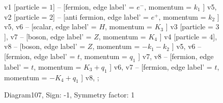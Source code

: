 \documentclass{revtex4}
\begin{document}
\begin{figure}[!htb]
\begin{center}
{    %
v1 [particle = \(1\)] -- [fermion, edge label' = \(e^{-}\), momentum = \(k_{1}\) ] v5, 
v2 [particle = \(2\)] -- [anti fermion, edge label' = \(e^{+}\), momentum = \(k_{2}\) ] v5, 
v6 -- [scalar, edge label' = \(H\), momentum = \(K_{3}\) ] v3 [particle = \(3\)], 
v7 -- [boson, edge label' = \(Z\), momentum = \(K_{4}\) ] v4 [particle = \(4\)], 
v8 -- [boson, edge label' = \(Z\), momentum = \(-k_{1} - k_{2}\) ] v5, 
v6 -- [fermion, edge label' = \(t\), momentum = \(q_{1}\) ] v7, 
v8 -- [fermion, edge label' = \(t\), momentum = \(K_{3} + q_{1}\) ] v6, 
v7 -- [fermion, edge label' = \(t\), momentum = \(-K_{4} + q_{1}\) ] v8, 
};
\end{center}
\caption{Diagram107, Sign: -1, Symmetry factor: 1}
\end{figure}
\newpage
\end{document}

